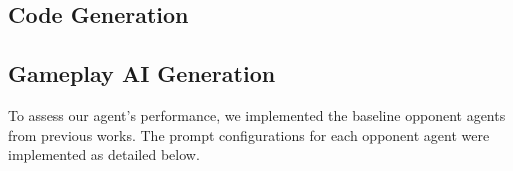 \subsection{Code Generation}


\subsection{Gameplay AI Generation}



To assess our agent's performance, we implemented the baseline opponent agents from previous works. The prompt configurations for each opponent agent were implemented as detailed below.

